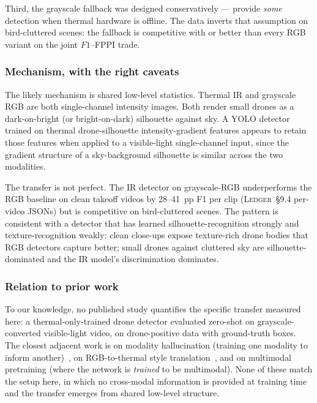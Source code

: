 Third, the grayscale fallback was designed conservatively --- provide \emph{some} detection when thermal hardware is offline. The data inverts that assumption on bird-cluttered scenes: the fallback is competitive with or better than every RGB variant on the joint $F1$--FPPI trade.

\subsubsection{Mechanism, with the right caveats}

The likely mechanism is shared low-level statistics. Thermal IR and grayscale RGB are both single-channel intensity images. Both render small drones as a dark-on-bright (or bright-on-dark) silhouette against sky. A YOLO detector trained on thermal drone-silhouette intensity-gradient features appears to retain those features when applied to a visible-light single-channel input, since the gradient structure of a sky-background silhouette is similar across the two modalities.

The transfer is not perfect. The IR detector on grayscale-RGB underperforms the RGB baseline on clean takeoff videos by 28--41~pp F1 per clip (\textsc{Ledger}~\S9.4 per-video JSONs) but is competitive on bird-cluttered scenes. The pattern is consistent with a detector that has learned silhouette-recognition strongly and texture-recognition weakly: clean close-ups expose texture-rich drone bodies that RGB detectors capture better; small drones against cluttered sky are silhouette-dominated and the IR model's discrimination dominates.

\subsubsection{Relation to prior work}

To our knowledge, no published study quantifies the specific transfer measured here: a thermal-only-trained drone detector evaluated zero-shot on grayscale-converted visible-light video, on drone-positive data with ground-truth boxes. The closest adjacent work is on modality hallucination (training one modality to inform another)~\cite{hoffman2016modalityhallucination}, on RGB-to-thermal style translation~\cite{berg2018rgb2thermal,kniaz2018thermalgan}, and on multimodal pretraining (where the network is \emph{trained} to be multimodal). None of these match the setup here, in which no cross-modal information is provided at training time and the transfer emerges from shared low-level structure.

